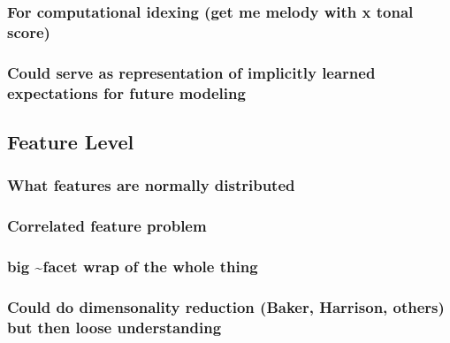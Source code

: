 \documentclass[]{book}
\theoremstyle{definition}
\theoremstyle{definition}
\theoremstyle{definition}
\theoremstyle{remark}
\begin{document}
\hypertarget{for-computational-idexing-get-me-melody-with-x-tonal-score}{%
\subsubsection{For computational idexing (get me melody with x tonal
score)}\label{for-computational-idexing-get-me-melody-with-x-tonal-score}}

\hypertarget{could-serve-as-representation-of-implicitly-learned-expectations-for-future-modeling}{%
\subsubsection{Could serve as representation of implicitly learned
expectations for future
modeling}\label{could-serve-as-representation-of-implicitly-learned-expectations-for-future-modeling}}

\hypertarget{feature-level}{%
\subsection{Feature Level}\label{feature-level}}

\hypertarget{what-features-are-normally-distributed}{%
\subsubsection{What features are normally
distributed}\label{what-features-are-normally-distributed}}

\hypertarget{correlated-feature-problem}{%
\subsubsection{Correlated feature
problem}\label{correlated-feature-problem}}

\hypertarget{big-facet-wrap-of-the-whole-thing}{%
\subsubsection{big \textasciitilde{}facet wrap of the whole
thing}\label{big-facet-wrap-of-the-whole-thing}}

\hypertarget{could-do-dimensonality-reduction-baker-harrison-others-but-then-loose-understanding}{%
\subsubsection{Could do dimensonality reduction (Baker, Harrison,
others) but then loose
understanding}\label{could-do-dimensonality-reduction-baker-harrison-others-but-then-loose-understanding}}
\end{document}

